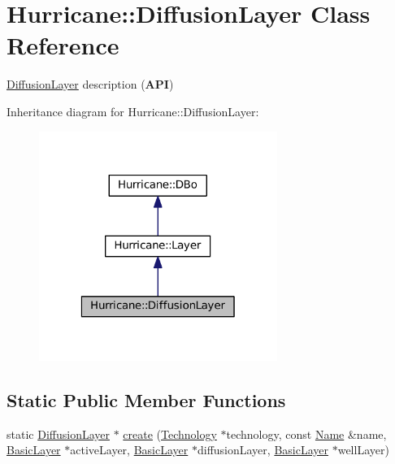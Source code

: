 \hypertarget{classHurricane_1_1DiffusionLayer}{}\section{Hurricane\+:\+:Diffusion\+Layer Class Reference}
\label{classHurricane_1_1DiffusionLayer}


\mbox{\hyperlink{classHurricane_1_1DiffusionLayer}{Diffusion\+Layer}} description ({\bfseries A\+PI})  




Inheritance diagram for Hurricane\+:\+:Diffusion\+Layer\+:\nopagebreak
\begin{figure}[H]
\begin{center}
\leavevmode
\includegraphics[width=220pt]{classHurricane_1_1DiffusionLayer__inherit__graph}
\end{center}
\end{figure}
\subsection*{Static Public Member Functions}
\begin{DoxyCompactItemize}
\item 
static \mbox{\hyperlink{classHurricane_1_1DiffusionLayer}{Diffusion\+Layer}} $\ast$ \mbox{\hyperlink{classHurricane_1_1DiffusionLayer_a91b5f8a20b005c20b4b9b9080250939e}{create}} (\mbox{\hyperlink{classHurricane_1_1Technology}{Technology}} $\ast$technology, const \mbox{\hyperlink{classHurricane_1_1Name}{Name}} \&name, \mbox{\hyperlink{classHurricane_1_1BasicLayer}{Basic\+Layer}} $\ast$active\+Layer, \mbox{\hyperlink{classHurricane_1_1BasicLayer}{Basic\+Layer}} $\ast$diffusion\+Layer, \mbox{\hyperlink{classHurricane_1_1BasicLayer}{Basic\+Layer}} $\ast$well\+Layer)
\end{DoxyCompactItemize}
